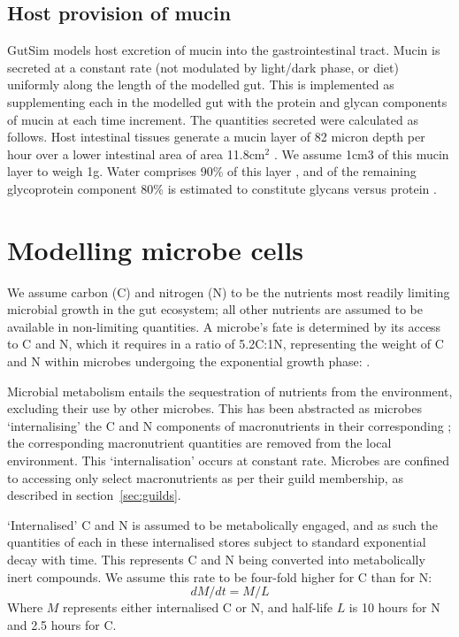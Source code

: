 \documentclass{article}
\begin{document}
\subsection{Host provision of mucin}

GutSim models host excretion of mucin into the gastrointestinal tract. 
Mucin is secreted at a constant rate (not modulated by light/dark phase, or diet) uniformly along the length of the modelled gut. 
This is implemented as supplementing each \nutstore in the modelled gut with the protein and glycan components of mucin at each time increment. 
The quantities secreted were calculated as follows. 
Host intestinal tissues generate a mucin layer of 82 micron depth per hour \cite{Ermund2013} over a lower intestinal area of area 11.8cm$^2$ \cite{Wolczuk2011}.
We assume 1cm3 of this mucin layer to weigh 1g.
Water comprises 90\% of this layer \cite{Macfarlane2005}, and of the remaining glycoprotein component 80\% is estimated to constitute glycans versus protein \cite{Bansil2006}. 

\section{Modelling microbe cells}

We assume carbon (C) and nitrogen (N) to be the nutrients most readily limiting microbial growth in the gut ecosystem; all other nutrients are assumed to be available in non-limiting quantities. 
A microbe's fate is determined by its access to C and N, which it requires in a ratio of 5.2C:1N, representing the weight of C and N within microbes undergoing the exponential growth phase: \cite{Vrede2002,Chrzanowski1996}.

Microbial metabolism entails the sequestration of nutrients from the environment, excluding their use by other microbes. 
This has been abstracted as microbes `internalising' the C and N components of macronutrients in their corresponding \nutstore; the corresponding macronutrient quantities are removed from the local environment.
This `internalisation' occurs at constant rate. 
Microbes are confined to accessing only select macronutrients as per their guild membership, as described in section~\ref{sec:guilds}.

`Internalised' C and N is assumed to be metabolically engaged, and as such the quantities of each in these internalised stores subject to standard exponential decay with time. 
This represents C and N being converted into metabolically inert compounds. 
We assume this rate to be four-fold higher for C than for N:
\begin{equation}
dM / dt = M / L
\end{equation}
Where $M$ represents either internalised C or N, and half-life $L$ is 10 hours for N and 2.5 hours for C.
\end{document}
